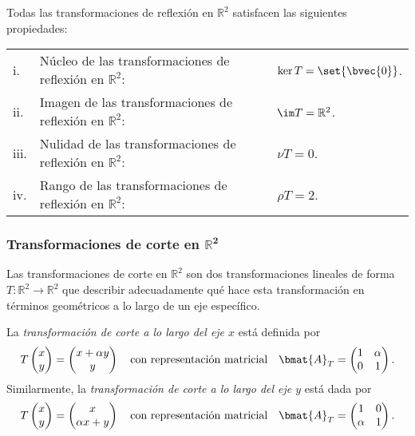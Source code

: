 \documentclass{fmbnotes}
\begin{document}
Todas las transformaciones de reflexión en \(\mathbb{R}^{2}\) satisfacen las siguientes propiedades:
\begin{longtable}{lll}
	\rule[1ex]{0pt}{2.5ex}i.&Núcleo de las transformaciones de reflexión en \(\mathbb{R}^{2}\): &\(\ker T = \set{\bvec{0}}\). \\
	\rule[1ex]{0pt}{2.5ex}ii.&Imagen de las transformaciones de reflexión en \(\mathbb{R}^{2}\): &\(\im T = \mathbb{R}^{2}\). \\
	\rule[1ex]{0pt}{2.5ex}iii.&Nulidad de las transformaciones de reflexión en \(\mathbb{R}^{2}\): &\(\nu T = 0\). \\
	\rule[1ex]{0pt}{2.5ex}iv.&Rango de las transformaciones de reflexión en \(\mathbb{R}^{2}\): &\(\rho T = 2\). \\
\end{longtable}

\subsubsection[Transformaciones de corte en \(\mathbb{R}^{2}\)]{Transformaciones de corte en \(\bm{\mathbb{R}^{2}}\)} 

Las transformaciones de corte en \(\mathbb{R}^{2}\) son dos transformaciones lineales de forma \(T\colon\mathbb{R}^{2}\to\mathbb{R}^{2}\) que \textcolor{red!80!black}{describir adecuadamente qué hace esta transformación en términos geométricos} a lo largo de un eje específico.

La \emph{transformación de corte a lo largo del eje \(x\)} está definida por 
\[T\begin{pmatrix}
x \\ y
\end{pmatrix}=\begin{pmatrix}
x+\alpha y \\ y
\end{pmatrix} \quad \text{con representación matricial} \quad \bmat{A}_T=\begin{pmatrix}
1 & \alpha \\ 0 & 1
\end{pmatrix}.\]
Similarmente, la \emph{transformación de corte a lo largo del eje \(y\)} está dada por  
\[T\begin{pmatrix}
x \\ y
\end{pmatrix}=\begin{pmatrix}
x \\ \alpha x + y
\end{pmatrix} \quad \text{con representación matricial} \quad \bmat{A}_T=\begin{pmatrix}
1 & 0 \\ \alpha & 1
\end{pmatrix}.\]
\end{document}
